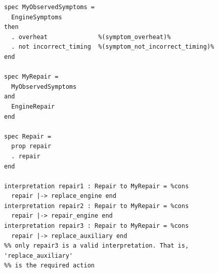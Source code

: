 \documentclass[10pt,fleqn,final]{scrreprt}
\begin{document}
\begin{lstlisting}[basicstyle=\ttfamily,language=dolText,alsolanguage=prop,escapechar=@,mathescape]
%% application to a specific case
spec MyObservedSymptoms =
  EngineSymptoms
then
  . overheat              %(symptom_overheat)%
  . not incorrect_timing  %(symptom_not_incorrect_timing)%
end

spec MyRepair =
  MyObservedSymptoms
and 
  EngineRepair
end

spec Repair =
  prop repair
  . repair
end

interpretation repair1 : Repair to MyRepair = %cons
  repair |-> replace_engine end
interpretation repair2 : Repair to MyRepair = %cons
  repair |-> repair_engine end
interpretation repair3 : Repair to MyRepair = %cons
  repair |-> replace_auxiliary end 
%% only repair3 is a valid interpretation. That is, 'replace_auxiliary'
%% is the required action
\end{lstlisting}
\end{document}
